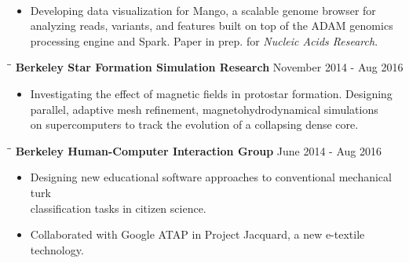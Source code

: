 \documentclass{res}
\begin{document}
\begin{resume}
\begin{tabbing}
        \\ 
   \end{tabbing}    
    \begin{itemize}
     \vspace{-20pt}
     \item  Developing data visualization for Mango, a scalable genome browser for \\analyzing reads, variants, and features built on top of the ADAM genomics \\processing engine and Spark.  Paper in prep. for \textit{Nucleic Acids Research}.
     \end{itemize}
     \vspace{-20pt}   
     \begin{tabbing}
   \hspace{2.3in}\= \hspace{2.6in}\= \kill 
    {\bf Berkeley Star Formation Simulation Research}  \>\hspace{171pt}  November 2014 - Aug 2016
        \\ 
   \end{tabbing}    
    \begin{itemize}
     \vspace{-20pt}
     \item  Investigating the effect of magnetic fields in protostar formation. Designing\\ parallel, adaptive mesh refinement, magnetohydrodynamical simulations \\ on supercomputers to track the evolution of a collapsing dense core.
     \end{itemize}
     \vspace{-20pt}
        \begin{tabbing}
   \hspace{2.3in}\= \hspace{2.6in}\= \kill 
    {\bf  Berkeley Human-Computer Interaction Group} \>\hspace{193pt}  June 2014 - Aug 2016
        \\ 
   \end{tabbing}  
   \vspace{-20pt}
     \begin{itemize}
	\item Designing new educational software approaches to conventional mechanical turk \\ classification tasks in citizen science. 
     \item Collaborated with Google ATAP in Project Jacquard, a new e-textile technology.  

\end{itemize}
\end{resume}
\end{document}
